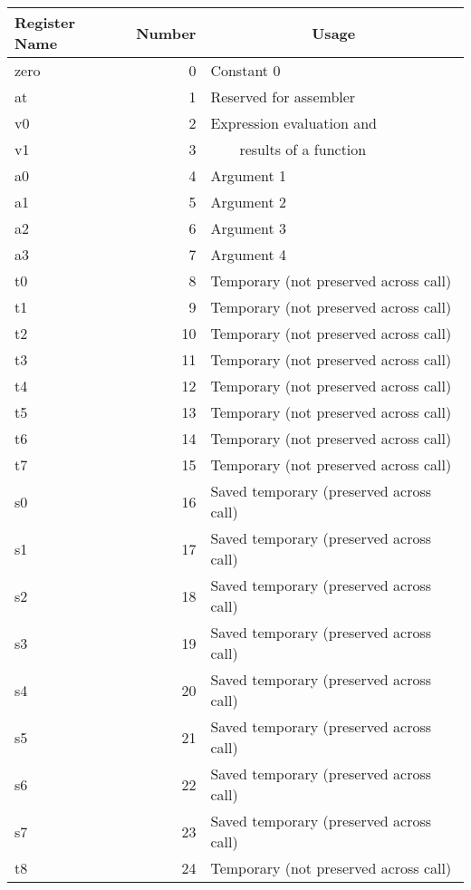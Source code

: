\begin{table}
  \small
  \begin{center}
  \begin{tabular}{|l|r|l|}
    \hline
     {\bf Register Name} & {\bf Number} & \multicolumn{1}{|c|}{\bf Usage} \\
     \hline
     \hline
      zero & 0 & Constant 0 \\
      at & 1 & Reserved for assembler \\
      v0 & 2 & Expression evaluation and \\
      v1 & 3 & \ \ \ \ results of a function \\
      a0 & 4 & Argument 1 \\
      a1 & 5 & Argument 2 \\
      a2 & 6 & Argument 3 \\
      a3 & 7 & Argument 4 \\
      t0 & 8 & Temporary (not preserved across call) \\
      t1 & 9 & Temporary (not preserved across call) \\
      t2 & 10 & Temporary (not preserved across call) \\
      t3 & 11 & Temporary (not preserved across call) \\
      t4 & 12 & Temporary (not preserved across call) \\
      t5 & 13 & Temporary (not preserved across call) \\
      t6 & 14 & Temporary (not preserved across call) \\
      t7 & 15 & Temporary (not preserved across call) \\
      s0 & 16 & Saved temporary (preserved across call) \\
      s1 & 17 & Saved temporary (preserved across call) \\
      s2 & 18 & Saved temporary (preserved across call) \\
      s3 & 19 & Saved temporary (preserved across call) \\
      s4 & 20 & Saved temporary (preserved across call) \\
      s5 & 21 & Saved temporary (preserved across call) \\
      s6 & 22 & Saved temporary (preserved across call) \\
      s7 & 23 & Saved temporary (preserved across call) \\
      t8 & 24 & Temporary (not preserved across call) \\

\end{tabular}
\end{center}
\end{table}
